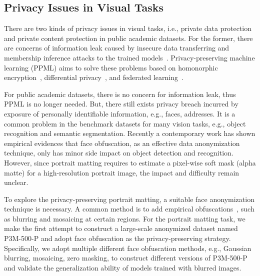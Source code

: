 \documentclass[twocolumn]{svjour3}
\begin{document}
\subsection{Privacy Issues in Visual Tasks}
There are two kinds of privacy issues in visual tasks, i.e., private data protection and private content protection in public academic datasets. For the former, there are concerns of information leak caused by insecure data transferring and membership inference attacks to the trained models~\citep{shokri2017membership,hisamoto2020membership,fredrikson2015model,carlini2019secret}. Privacy-preserving machine learning (PPML) aims to solve these problems based on homonorphic encryption~\citep{erkin2009privacy,yonetani2017privacy}, differential privacy~\citep{NEURIPS2020_fc4ddc15,pmlr-v161-he21a}, and federated learning~\citep{truex2019hybrid}.

For public academic datasets, there is no concern for information leak, thus PPML is no longer needed. But, there still exists privacy breach incurred by exposure of personally identifiable information, e.g., faces, addresses. It is a common problem in the benchmark datasets for many vision tasks, e.g., object recognition and semantic segmentation. Recently a contemporary work \citep{yang2021study} has shown empirical evidences that face obfuscation, as an effective data anonymization technique, only has minor side impact on object detection and recognition. However, since portrait matting requires to estimate a pixel-wise soft mask (alpha matte) for a high-resolution portrait image, the impact and difficulty remain unclear.

To explore the privacy-preserving portrait matting, a suitable face anonymization technique is necessary. A common method is to add empirical obfuscations~\citep{uittenbogaard2019privacy,caesar2020nuscenes,frome2009large,yang2021study}, such as blurring and mosaicing at certain regions. For the portrait matting task, we make the first attempt to construct a large-scale anonymized dataset named P3M-500-P and adopt face obfuscation as the privacy-preserving strategy. Specifically, we adopt multiple different face obfuscation methods, e.g., Gaussian blurring, mosaicing, zero masking, to construct different versions of P3M-500-P and validate the generalization ability of models trained with blurred images.
\end{document}
